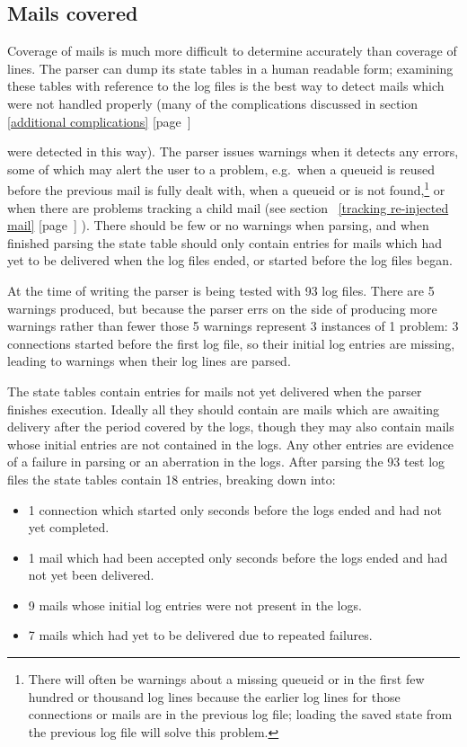 \documentclass[a4paper,12pt,draft]{article}
\newcommand{\refwithpage}[1]{%
    \empty{}\ref{#1} [page~\pageref{#1}]%
}
\begin{document}
\subsection{Mails covered}

\label{mails-covered}

Coverage of mails is much more difficult to determine accurately than
coverage of lines.  The parser can dump its state tables in a human
readable form; examining these tables with reference to the log files is
the best way to detect mails which were not handled properly (many of the
complications discussed in section~\refwithpage{additional complications}
were detected in this way).  The parser issues warnings when it detects any
errors, some of which may alert the user to a problem, e.g.\ when a queueid
is reused before the previous mail is fully dealt with, when a queueid or
\pid{} is not found,\footnote{There will often be warnings about a missing
queueid or \pid{} in the first few hundred or thousand log lines because
the earlier log lines for those connections or mails are in the previous
log file; loading the saved state from the previous log file will solve
this problem.} or when there are problems tracking a child mail (see
section~\refwithpage{tracking re-injected mail}).  There should be few or
no warnings when parsing, and when finished parsing the state table should
only contain entries for mails which had yet to be delivered when the log
files ended, or started before the log files began.

At the time of writing the parser is being tested with 93 log files.  There
are 5 warnings produced, but because the parser errs on the side of
producing more warnings rather than fewer those 5 warnings represent 3
instances of 1 problem: 3 connections started before the first log file, so
their initial log entries are missing, leading to warnings when their log
lines are parsed.

The state tables contain entries for mails not yet delivered when the
parser finishes execution.  Ideally all they should contain are mails which
are awaiting delivery after the period covered by the logs, though they may
also contain mails whose initial entries are not contained in the logs.
Any other entries are evidence of a failure in parsing or an aberration in
the logs.  After parsing the 93 test log files the state tables contain 18
entries, breaking down into:

\begin{itemize}

    \item 1 connection which started only seconds before the logs ended and
        had not yet completed.

    \item 1 mail which had been accepted only seconds before the logs ended
        and had not yet been delivered.

    \item 9 mails whose initial log entries were not present in the logs.

    \item 7 mails which had yet to be delivered due to repeated failures.

\end{itemize}
\end{document}
